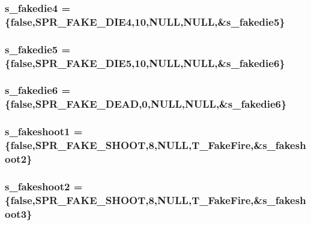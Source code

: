 \label{WL__ACT2_8C_a9b8baf4f50daeeb1f9d86dc8576ac8ef}
\hypertarget{WL__ACT2_8C_ac4afbd385f447724aeadd9b14a3277aa}{
\subsubsection[{s\_\-fakedie4}]{ {\bf s\_\-fakedie4} = \{false,SPR\_\-FAKE\_\-DIE4,10,NULL,NULL,\&{\bf s\_\-fakedie5}\}}}
\label{WL__ACT2_8C_ac4afbd385f447724aeadd9b14a3277aa}
\hypertarget{WL__ACT2_8C_ab4f024cc5e316fbd9fbf59e48e22353a}{
\subsubsection[{s\_\-fakedie5}]{ {\bf s\_\-fakedie5} = \{false,SPR\_\-FAKE\_\-DIE5,10,NULL,NULL,\&{\bf s\_\-fakedie6}\}}}
\label{WL__ACT2_8C_ab4f024cc5e316fbd9fbf59e48e22353a}
\hypertarget{WL__ACT2_8C_a7238b6642ffa8a01492f6ff84a36e4ef}{
\subsubsection[{s\_\-fakedie6}]{ {\bf s\_\-fakedie6} = \{false,SPR\_\-FAKE\_\-DEAD,0,NULL,NULL,\&{\bf s\_\-fakedie6}\}}}
\label{WL__ACT2_8C_a7238b6642ffa8a01492f6ff84a36e4ef}
\hypertarget{WL__ACT2_8C_a3a311aefad46f6143d5cd436be79fc0f}{
\subsubsection[{s\_\-fakeshoot1}]{ {\bf s\_\-fakeshoot1} = \{false,SPR\_\-FAKE\_\-SHOOT,8,NULL,T\_\-FakeFire,\&{\bf s\_\-fakeshoot2}\}}}
\label{WL__ACT2_8C_a3a311aefad46f6143d5cd436be79fc0f}
\hypertarget{WL__ACT2_8C_ae09d40e3d3f28f4c95b02e8705cc48d8}{
\subsubsection[{s\_\-fakeshoot2}]{ {\bf s\_\-fakeshoot2} = \{false,SPR\_\-FAKE\_\-SHOOT,8,NULL,T\_\-FakeFire,\&{\bf s\_\-fakeshoot3}\}}}
